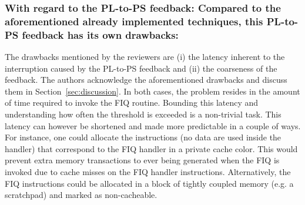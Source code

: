 
        \subsubsection{With regard to the PL-to-PS feedback: Compared
        to the aforementioned already implemented techniques, this
        PL-to-PS feedback has its own drawbacks:}

        The drawbacks mentioned by the reviewers are (i) the latency
        inherent to the interruption caused by the PL-to-PS feedback
        and (ii) the coarseness of the feedback.  The authors
        acknowledge the aforementioned drawbacks and discuss them in
        Section~\ref{sec:discussion}. In both cases, the problem
        resides in the amount of time required to invoke the FIQ
        routine. Bounding this latency and understanding how often the
        threshold is exceeded is a non-trivial task. This latency can
        however be shortened and made more predictable in a couple of
        ways. For instance, one could allocate the instructions (no
        data are used inside the handler) that correspond to the FIQ
        handler in a private cache color. This would prevent extra
        memory transactions to ever being generated when the FIQ is
        invoked due to cache misses on the FIQ handler
        instructions. Alternatively, the FIQ instructions could be
        allocated in a block of tightly coupled memory (e.g. a
        scratchpad) and marked as non-cacheable.
